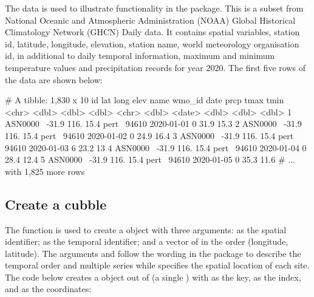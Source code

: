 \documentclass[
  shortnames]{jss}
\begin{document}
The data  is used to illustrate functionality in the  package. This is a subset from National Oceanic and Atmospheric Administration (NOAA) \citep{noaa} Global Historical Climatology Network (GHCN) Daily data. It contains spatial variables, station id, latitude, longitude, elevation, station name, world meteorology organisation id, in additional to daily temporal information, maximum and minimum temperature values and precipitation records for year 2020. The first five rows of the data are shown below:

\begin{CodeChunk}
\begin{CodeOutput}
# A tibble: 1,830 x 10
  id         lat  long  elev name  wmo_id date        prcp  tmax  tmin
  <chr>    <dbl> <dbl> <dbl> <chr>  <dbl> <date>     <dbl> <dbl> <dbl>
1 ASN0000~ -31.9  116.  15.4 pert~  94610 2020-01-01     0  31.9  15.3
2 ASN0000~ -31.9  116.  15.4 pert~  94610 2020-01-02     0  24.9  16.4
3 ASN0000~ -31.9  116.  15.4 pert~  94610 2020-01-03     6  23.2  13  
4 ASN0000~ -31.9  116.  15.4 pert~  94610 2020-01-04     0  28.4  12.4
5 ASN0000~ -31.9  116.  15.4 pert~  94610 2020-01-05     0  35.3  11.6
# ... with 1,825 more rows
\end{CodeOutput}
\end{CodeChunk}

\hypertarget{create}{%
\subsection{Create a cubble}\label{create}}

The function  is used to create a  object with three arguments:  as the spatial identifier;  as the temporal identifier; and a vector of  in the order (longitude, latitude). The arguments  and  follow the wording in the  package to describe the temporal order and multiple series while  specifies the spatial location of each site. The code below creates a  object out of  (a single ) with  as the key,  as the index, and  as the coordinates:
\end{document}
